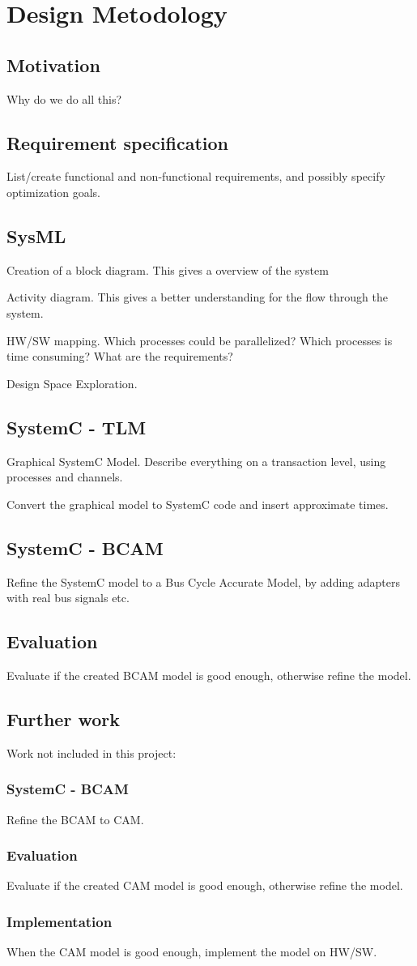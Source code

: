 \chapter{Design Metodology}

\section{Motivation}
Why do we do all this?

\section{Requirement specification}
List/create functional and non-functional requirements, and possibly specify optimization goals.

\section{SysML}
Creation of a block diagram. This gives a overview of the system

Activity diagram. This gives a better understanding for the flow through the system.

HW/SW mapping. Which processes could be parallelized? Which processes is time consuming? What are the requirements?

Design Space Exploration.


\section{SystemC - TLM}
Graphical SystemC Model. Describe everything on a transaction level, using processes and channels.

Convert the graphical model to SystemC code and insert approximate times.

\section{SystemC - BCAM}
Refine the SystemC model to a Bus Cycle Accurate Model, by adding adapters with real bus signals etc.


\section{Evaluation}
Evaluate if the created BCAM model is good enough, otherwise refine the model.

\section{Further work}
Work not included in this project:
\subsection{SystemC - BCAM}
Refine the BCAM to CAM.

\subsection{Evaluation}
Evaluate if the created CAM model is good enough, otherwise refine the model.

\subsection{Implementation}
When the CAM model is good enough, implement the model on HW/SW.